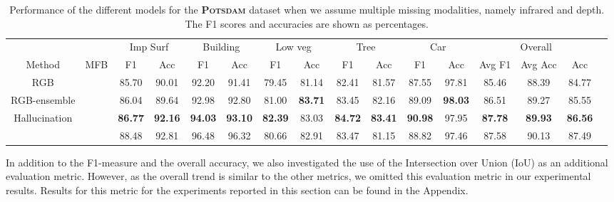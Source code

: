 \documentclass[journal]{IEEEtran}
\newcommand{\cmark}{\ding{51}}%
\begin{document}
\begin{table*}[t]
\begin{center}
\begin{tabular}{lc|c|c|c|c|c|c|c|c|c|c|c|c|c|c|}
\cline{3-15}
& & \multicolumn{2}{|c|}{Imp Surf} & \multicolumn{2}{c|}{Building} & \multicolumn{2}{c|}{Low veg} & \multicolumn{2}{c|}{Tree} & \multicolumn{2}{c|}{Car} & \multicolumn{3}{c|}{Overall}\\
\cline{1-15}
\multicolumn{1}{|c|}{Method} & \multicolumn{1}{|c|}{MFB} & F1 & Acc & F1 & Acc & F1 & Acc & F1 & Acc & F1 & Acc & Avg F1 & Avg Acc & Acc\\
\cline{1-15} 
\multicolumn{1}{|c|}{RGB} & \cmark & 85.70 & 90.01 & 92.20 & 91.41 & 79.45 & 81.14 & 82.41 & 81.57 & 87.55 & 97.81 & 85.46 & 88.39 & 84.77\\
\cline{2-15}
\multicolumn{1}{|c|}{RGB-ensemble} & \cmark & 86.04 & 89.64 & 92.98 & 92.80 & 81.00 & {\bf83.71} & 83.45 & 82.16 & 89.09 & {\bf98.03} & 86.51 & 89.27 & 85.55\\
\cline{2-15}
\multicolumn{1}{|c|}{Hallucination} & \cmark & {\bf86.77} & {\bf92.16} & {\bf94.03} & {\bf93.10} & {\bf82.39} & 83.03 & {\bf84.72} & {\bf83.41} & {\bf90.98} & 97.95 & {\bf87.78} & {\bf89.93} & {\bf86.56}\\
\hdashline
\multicolumn{1}{|c|}{RGB\&I\&Depth} & \cmark & 88.48 & 92.81 & 96.48 & 96.32 & 80.66 & 82.91 & 83.47 & 81.15 & 88.82 & 97.46 & 87.58 & 90.13 & 87.49\\
\hline
\end{tabular}
\vspace{0.2cm}
\caption{Performance of the different models for the {\bf\scshape Potsdam} dataset when we assume multiple missing modalities, namely infrared and depth. The F1 scores and accuracies are shown as percentages.}
\label{tab:resultsMultiMissing}
\end{center}
\end{table*}

In addition to the F1-measure and the overall accuracy, we also investigated the use of the Intersection over Union (IoU) as an additional evaluation metric. However, as the overall trend is similar to the other metrics, we omitted this evaluation metric in our experimental results. Results for this metric for the experiments reported in this section can be found in the Appendix.
\end{document}
